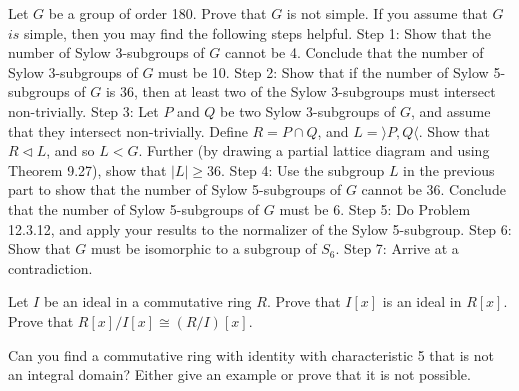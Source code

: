 \documentclass[12pt,letterpaper,boxed]{hmcpset}
\begin{document}

\begin{problem}[12.3.23]
Let $G$ be a group of order 180. Prove that $G$ is not simple.
\newline If you assume that $G$ $\textit{is}$ simple, then you may find the following steps helpful.
\newline
Step 1: Show that the number of Sylow 3-subgroups of $G$ cannot be 4.  Conclude that the number of Sylow 3-subgroups of $G$ must be 10.
\newline
Step 2: Show that if the number of Sylow 5-subgroups of $G$ is 36, then at least two  of the Sylow 3-subgroups must intersect non-trivially.
\newline
Step 3: Let $P$ and $Q$ be two Sylow 3-subgroups of $G$, and assume that they intersect non-trivially. Define $R = P \cap Q$, and $L = \rangle P,Q \langle$. Show that $R \triangleleft L$, and so $L < G$. Further (by drawing a partial lattice diagram and using Theorem 9.27), show that $\vert L \vert \geq 36$.
\newline
Step 4: Use the subgroup $L$ in the previous part to show that the number of Sylow 5-subgroups of $G$ cannot be 36. Conclude that the number of Sylow 5-subgroups of $G$ must be 6.
\newline
Step 5: Do Problem 12.3.12, and apply your results to the normalizer of the Sylow 5-subgroup.
\newline
Step 6: Show that $G$ must be isomorphic to a subgroup of $S_6$.
\newline
Step 7: Arrive at a contradiction.
\end{problem}

\begin{solution}
\end{solution}

\clearpage

\begin{problem}[16.2.12]
Let $I$ be an ideal in a commutative ring $R$. Prove that $I[x]$ is an ideal in $R[x]$. Prove that $R[x]/I[x] \cong (R/I)[x]$.
\end{problem}

\begin{solution}
\end{solution}

\clearpage

\begin{problem}[16.3.1]
Can you find a commutative ring with identity with characteristic 5 that is not an integral domain? Either give an example or prove that it is not possible.
\end{problem}
\end{document}

